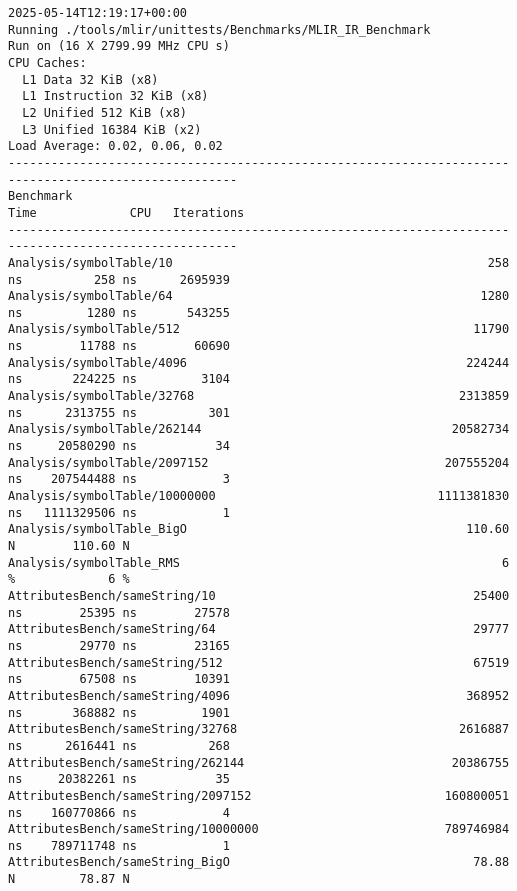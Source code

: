 \begin{code}
    \begin{verbatim}
2025-05-14T12:19:17+00:00
Running ./tools/mlir/unittests/Benchmarks/MLIR_IR_Benchmark
Run on (16 X 2799.99 MHz CPU s)
CPU Caches:
  L1 Data 32 KiB (x8)
  L1 Instruction 32 KiB (x8)
  L2 Unified 512 KiB (x8)
  L3 Unified 16384 KiB (x2)
Load Average: 0.02, 0.06, 0.02
------------------------------------------------------------------------------------------------------
Benchmark                                                            Time             CPU   Iterations
------------------------------------------------------------------------------------------------------
Analysis/symbolTable/10                                            258 ns          258 ns      2695939
Analysis/symbolTable/64                                           1280 ns         1280 ns       543255
Analysis/symbolTable/512                                         11790 ns        11788 ns        60690
Analysis/symbolTable/4096                                       224244 ns       224225 ns         3104
Analysis/symbolTable/32768                                     2313859 ns      2313755 ns          301
Analysis/symbolTable/262144                                   20582734 ns     20580290 ns           34
Analysis/symbolTable/2097152                                 207555204 ns    207544488 ns            3
Analysis/symbolTable/10000000                               1111381830 ns   1111329506 ns            1
Analysis/symbolTable_BigO                                       110.60 N        110.60 N
Analysis/symbolTable_RMS                                             6 %             6 %
AttributesBench/sameString/10                                    25400 ns        25395 ns        27578
AttributesBench/sameString/64                                    29777 ns        29770 ns        23165
AttributesBench/sameString/512                                   67519 ns        67508 ns        10391
AttributesBench/sameString/4096                                 368952 ns       368882 ns         1901
AttributesBench/sameString/32768                               2616887 ns      2616441 ns          268
AttributesBench/sameString/262144                             20386755 ns     20382261 ns           35
AttributesBench/sameString/2097152                           160800051 ns    160770866 ns            4
AttributesBench/sameString/10000000                          789746984 ns    789711748 ns            1
AttributesBench/sameString_BigO                                  78.88 N         78.87 N

\end{verbatim}
\end{code}
